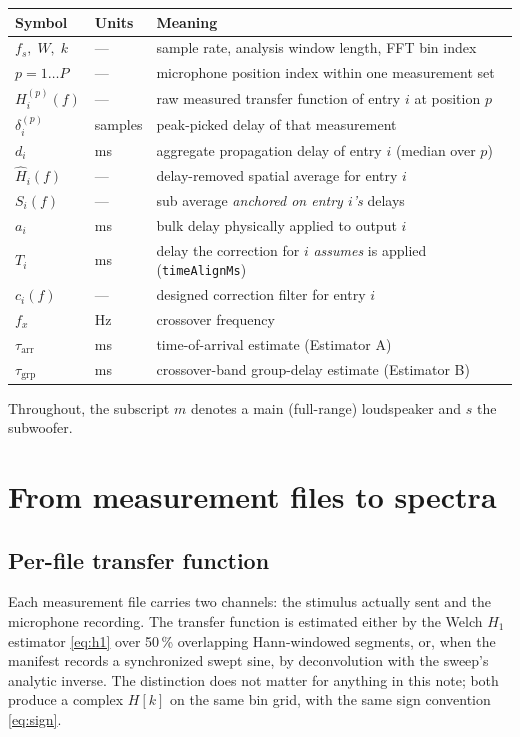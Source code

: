 \documentclass[11pt,a4paper]{article}
\newcommand{\code}[1]{\texttt{\small #1}}
\begin{document}
\begin{center}
\begin{tabularx}{\textwidth}{@{}llX@{}}
\toprule
Symbol & Units & Meaning \\
\midrule
$f_s,\;W,\;k$ & --- & sample rate, analysis window length, FFT bin index \\
$p = 1\ldots P$ & --- & microphone position index within one measurement set \\
$H_i^{(p)}(f)$ & --- & raw measured transfer function of entry $i$ at position $p$ \\
$\delta_i^{(p)}$ & samples & peak-picked delay of that measurement \\
$d_i$ & ms & aggregate propagation delay of entry $i$ (median over $p$) \\
$\hat H_i(f)$ & --- & delay-removed spatial average for entry $i$ \\
$S_i(f)$ & --- & sub average \emph{anchored on entry $i$'s} delays \\
$a_i$ & ms & bulk delay physically applied to output $i$ \\
$T_i$ & ms & delay the correction for $i$ \emph{assumes} is applied (\code{timeAlignMs}) \\
$c_i(f)$ & --- & designed correction filter for entry $i$ \\
$f_x$ & Hz & crossover frequency \\
$\tau_{\mathrm{arr}}$ & ms & time-of-arrival estimate (Estimator A) \\
$\tau_{\mathrm{grp}}$ & ms & crossover-band group-delay estimate (Estimator B) \\
\bottomrule
\end{tabularx}
\end{center}

Throughout, the subscript $m$ denotes a main (full-range) loudspeaker and $s$
the subwoofer.

\section{From measurement files to spectra}

\subsection{Per-file transfer function}

Each measurement file carries two channels: the stimulus actually sent and the
microphone recording. The transfer function is estimated either by the Welch
$H_1$ estimator \eqref{eq:h1} over 50\,\% overlapping Hann-windowed segments, or,
when the manifest records a synchronized swept sine, by deconvolution with the
sweep's analytic inverse. The distinction does not matter for anything in this
note; both produce a complex $H[k]$ on the same bin grid, with the same sign
convention \eqref{eq:sign}.
\end{document}
